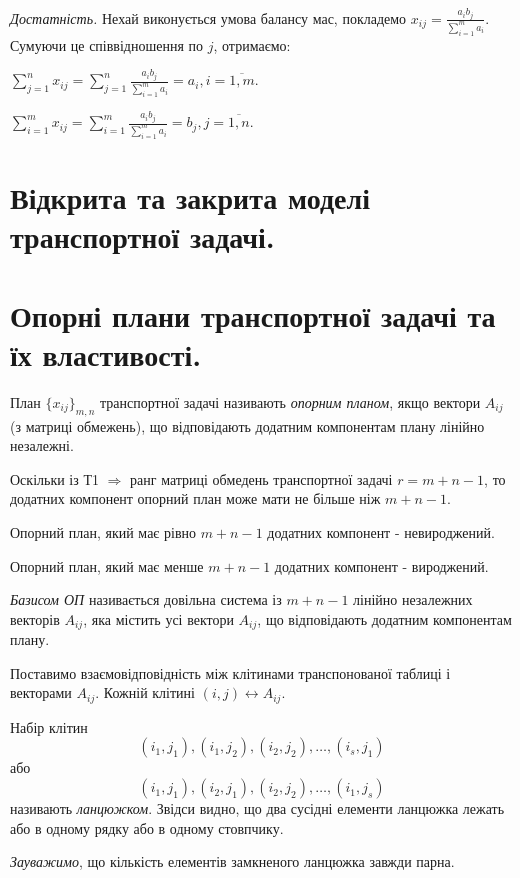 \documentclass[12pt,a4paper]{article}
\newenvironment{slim_itemize}{
\begin{itemize}
  \setlength{\itemsep}{1pt}
  \setlength{\parskip}{0pt}
  \setlength{\parsep}{0pt}}
{\end{itemize}}
\begin{document}
{\it Достатність.} Нехай виконується умова балансу мас, покладемо  $x_{ij} = \frac{a_ib_j}{\sum_{i=1}^m a_i}$. Сумуючи це співвідношення по $j$, отримаємо:

$\sum_{j=1}^n x_{ij} = \sum_{j=1}^n \frac{a_ib_j}{\sum_{i=1}^m a_i} = a_i,  i = \overline{1, m}.$

$\sum_{i=1}^m x_{ij} = \sum_{i=1}^m \frac{a_ib_j}{\sum_{i=1}^m a_i} = b_j,  j = \overline{1, n}.$

\clearpage

\section{Відкрита та закрита моделі транспортної задачі.}

\clearpage

\section{Опорні плани транспортної задачі та їх властивості.}

План $\{x_{ij}\}_{m,n}$ транспортної задачі називають \emph{опорним планом}, якщо вектори $A_{ij}$ (з матриці обмежень), що відповідають додатним компонентам плану лінійно незалежні.

Оскільки із Т1 $\Rightarrow$ ранг матриці обмедень транспортної задачі $r=m+n-1$, то додатних компонент опорний план може мати не більше ніж $m+n-1$.

\begin{slim_itemize}
  \item Опорний план, який має рівно $m+n-1$ додатних компонент - невироджений.
  \item Опорний план, який має менше $m+n-1$ додатних компонент - вироджений.
\end{slim_itemize}

\emph{Базисом ОП} називається довільна система із $m+n-1$ лінійно незалежних векторів $A_{ij}$, яка містить усі вектори $A_{ij}$, що відповідають додатним компонентам плану.

Поставимо взаємовідповідність між клітинами транспонованої таблиці і векторами $A_{ij}$. Кожній клітині $(i,j) \leftrightarrow A_{ij}$.

Набір клітин $$(i_1,j_1),(i_1,j_2),(i_2,j_2),\dots,(i_s,j_1)$$або$$(i_1,j_1),(i_2,j_1),(i_2,j_2),\dots,(i_1,j_s)$$
називають \emph{ланцюжком}. Звідси видно, що два сусідні елементи ланцюжка лежать або в одному рядку або в одному стовпчику.

\emph{Зауважимо}, що кількість елементів замкненого ланцюжка завжди парна.
\end{document}

